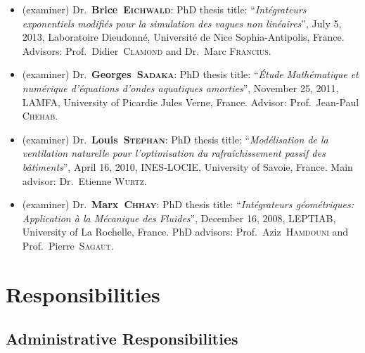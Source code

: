 \documentclass[final, a4paper, oneside, 12pt]{article}
\numberwithin{equation}{section}
\begin{document}
\begin{itemize}
  \item (examiner) Dr.~\textbf{Brice~\textsc{Eichwald}}: PhD thesis title: ``\textit{Int\'egrateurs exponentiels modifi\'es pour la simulation des vagues non lin\'eaires}'', July 5, 2013, Laboratoire Dieudonn\'e, Universit\'e de Nice Sophia-Antipolis, France. Advisors: Prof.~Didier~\textsc{Clamond} and Dr.~Marc \textsc{Francius}.

  \item (examiner) Dr.~\textbf{Georges~\textsc{Sadaka}}: PhD thesis title: ``\textit{\'Etude Math\'ematique et num\'erique d'\'equations d'ondes aquatiques amorties}'', November 25, 2011, LAMFA, University of Picardie Jules Verne, France. Advisor: Prof.~Jean-Paul \textsc{Chehab}.

  \item (examiner) Dr.~\textbf{Louis~\textsc{Stephan}}: PhD thesis title: ``\textit{Mod\'elisation de la ventilation naturelle pour l'optimisation du rafra\^ichissement passif des b\^atiments}'', April 16, 2010, INES-LOCIE, University of Savoie, France. Main advisor: Dr.~Etienne \textsc{Wurtz}.

  \item (examiner) Dr.~\textbf{Marx~\textsc{Chhay}}: PhD thesis title: ``\textit{Int\'egrateurs g\'eom\'etriques: Application \`a la M\'ecanique des Fluides}'', December 16, 2008, LEPTIAB, University of La Rochelle, France. PhD advisors: Prof.~Aziz~\textsc{Hamdouni} and Prof.~Pierre~\textsc{Sagaut}.

\end{itemize}


\section{Responsibilities}

\subsection{Administrative Responsibilities}
\end{document}
